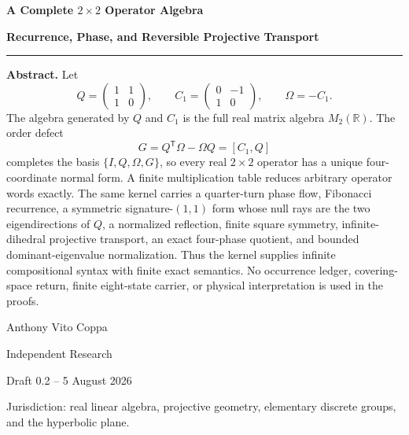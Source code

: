 \documentclass[11pt,letterpaper]{article}
\theoremstyle{kernelstyle}
\newcommand{\R}{\mathbb{R}}
\begin{document}
\hypersetup{pageanchor=false}

\begin{titlepage}
\thispagestyle{empty}
\vspace*{0.10\textheight}

{\fontsize{29}{34}\selectfont\bfseries\color{onyx} A Complete $2\times2$ Operator Algebra\par}
\vspace{0.7em}
{\fontsize{17}{22}\selectfont\bfseries Recurrence, Phase, and Reversible Projective Transport\par}

\vspace{2.1em}
\color{gold}\rule{0.62\textwidth}{1.1pt}\color{black}
\vspace{2.0em}

\begin{abstractbox}
\textbf{Abstract.}
Let
\[
Q=\begin{pmatrix}1&1\\1&0\end{pmatrix},
\qquad
C_1=\begin{pmatrix}0&-1\\1&0\end{pmatrix},
\qquad
\Omega=-C_1.
\]
The algebra generated by $Q$ and $C_1$ is the full real matrix algebra $M_2(\R)$.  The order defect
\[
G=Q^{\mathsf T}\Omega-\Omega Q=[C_1,Q]
\]
completes the basis $\{I,Q,\Omega,G\}$, so every real $2\times2$ operator has a unique four-coordinate normal form.  A finite multiplication table reduces arbitrary operator words exactly.  The same kernel carries a quarter-turn phase flow, Fibonacci recurrence, a symmetric signature-$(1,1)$ form whose null rays are the two eigendirections of $Q$, a normalized reflection, finite square symmetry, infinite-dihedral projective transport, an exact four-phase quotient, and bounded dominant-eigenvalue normalization.  Thus the kernel supplies infinite compositional syntax with finite exact semantics.  No occurrence ledger, covering-space return, finite eight-state carrier, or physical interpretation is used in the proofs.
\end{abstractbox}

\vfill
{\large Anthony Vito Coppa\par}
{\large Independent Research\par}
{\large Draft 0.2 -- 5 August 2026\par}
\vspace{0.6em}
{\small Jurisdiction: real linear algebra, projective geometry, elementary discrete groups, and the hyperbolic plane.\par}
\end{titlepage}
\hypersetup{pageanchor=true}
\end{document}
